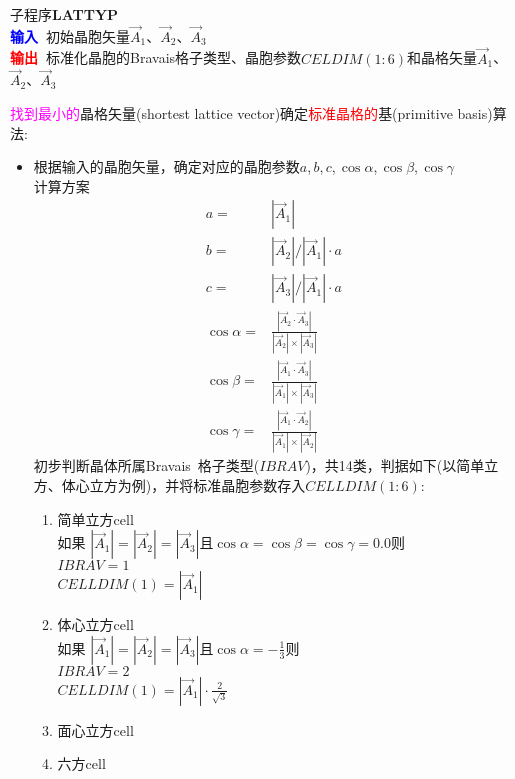 \documentclass{article}      %
\begin{document}
子程序\textbf{LATTYP}\\
\textbf{\textcolor{blue}{输入~}}初始晶胞矢量$\vec A_1$、$\vec A_2$、$\vec A_3$\\
\textbf{\textcolor{red}{输出~}}标准化晶胞的\textrm{Bravais}格子类型、晶胞参数$\mathit{CELDIM}(1:6)$和晶格矢量$\vec A_1$、$\vec A_2$、$\vec A_3$

\textcolor{magenta}{找到最小的}晶格矢量(\textrm{shortest lattice vector})确定\textcolor{red}{标准晶格的}基(\textrm{primitive basis})算法:~

\begin{itemize}
	\item 根据输入的晶胞矢量，确定对应的晶胞参数$a$,\,$b$,\,$c$,\,$\cos\alpha$,\,$\cos\beta$,\,$\cos\gamma$\\
		计算方案
		\begin{displaymath}
			\begin{aligned}
			a=&|\vec A_1|\\
			b=&|\vec A_2|/|\vec A_1|\cdot a\\
			c=&|\vec A_3|/|\vec A_1|\cdot a\\
			\cos\alpha=&\frac{|\vec A_2\cdot\vec A_3|}{|\vec A_2|\times|\vec A_3|}\\
			\cos\beta=&\frac{|\vec A_1\cdot\vec A_3|}{|\vec A_1|\times|\vec A_3|}\\
			\cos\gamma=&\frac{|\vec A_1\cdot\vec A_2|}{|\vec A_1|\times|\vec A_2|}
			\end{aligned}
			\label{eq:Cell_DM}
		\end{displaymath}
		初步判断晶体所属\textrm{Bravais~}格子类型($\mathit{IBRAV}$)，共14类，判据如下(以简单立方、体心立方为例)，并将标准晶胞参数存入$\mathit{CELLDIM}(1:6)$:~
		\begin{enumerate}
			\item 简单立方\textrm{cell}\\
				如果 $|\vec A_1|=|\vec A_2|=|\vec A_3|$且$\cos\alpha=\cos\beta=\cos\gamma=0.0$则\\
				$\mathit{IBRAV}=1$\\
				$\mathit{CELLDIM}(1)=|\vec A_1|$
			\item 体心立方\textrm{cell}\\
				如果 $|\vec A_1|=|\vec A_2|=|\vec A_3|$且$\cos\alpha=-\frac13$则\\
				$\mathit{IBRAV}=2$\\
				$\mathit{CELLDIM}(1)=|\vec A_1|\cdot\frac2{\sqrt3}$
			\item 面心立方\textrm{cell}
			\item 六方\textrm{cell}

\end{enumerate}
\end{itemize}
\end{document}
